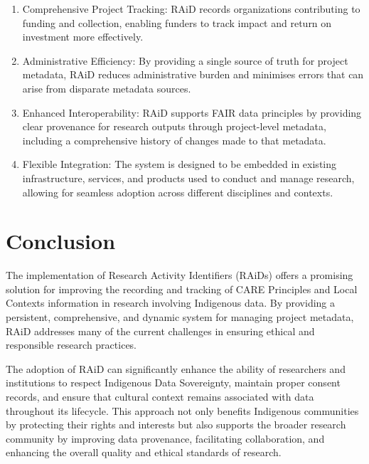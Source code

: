 \documentclass[a0,portrait]{a0poster}
\begin{document}
\begin{multicols}{2}
{\begin{enumerate}
  \item Comprehensive Project Tracking: RAiD records organizations contributing to funding and collection, enabling funders to track impact and return on investment more effectively.
  \item Administrative Efficiency: By providing a single source of truth for project metadata, RAiD reduces administrative burden and minimises errors that can arise from disparate metadata sources.
  \item Enhanced Interoperability: RAiD supports FAIR data principles by providing clear provenance for research outputs through project-level metadata, including a comprehensive history of changes made to that metadata.
  \item Flexible Integration: The system is designed to be embedded in existing infrastructure, services, and products used to conduct and manage research, allowing for seamless adoption across different disciplines and contexts.
\end{enumerate}

}

\color{ARDCPink}
\section*{\LARGE Conclusion}
\color{DarkGrey}
\large{
The implementation of Research Activity Identifiers (RAiDs) offers a promising solution for improving the recording and tracking of CARE Principles and Local Contexts information in research involving Indigenous data. By providing a persistent, comprehensive, and dynamic system for managing project metadata, RAiD addresses many of the current challenges in ensuring ethical and responsible research practices.

The adoption of RAiD can significantly enhance the ability of researchers and institutions to respect Indigenous Data Sovereignty, maintain proper consent records, and ensure that cultural context remains associated with data throughout its lifecycle. This approach not only benefits Indigenous communities by protecting their rights and interests but also supports the broader research community by improving data provenance, facilitating collaboration, and enhancing the overall quality and ethical standards of research.

}
\end{multicols}
\end{document}

